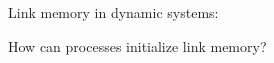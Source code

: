 \documentclass[10pt, xcolor={usenames, dvipsnames}]{beamer}
\newcommand{\xmark}{\ding{55}}
\newcommand{\NO}[1]{\textcolor{red}{#1}}
\begin{document}
\begin{frame}{Link memory in dynamic systems: \NO{\xmark}}
  



\end{frame}


\begin{frame}[standout]

  \vspace{2em}
  
  How can processes initialize link memory?
  
  \vspace{1.5em}
  
  \begin{center}
    
  \end{center}

\end{frame}
\end{document}
